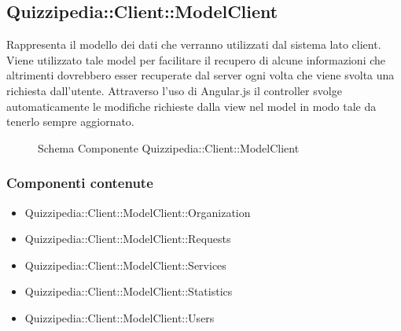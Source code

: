 \subsection{Quizzipedia::Client::ModelClient}
Rappresenta il modello dei dati che verranno utilizzati dal sistema lato client. Viene utilizzato tale model per facilitare il recupero di alcune informazioni che altrimenti dovrebbero esser recuperate dal server ogni volta che viene svolta una richiesta dall'utente.
Attraverso l'uso di Angular.js il controller svolge automaticamente le modifiche richieste dalla view nel model in modo tale da tenerlo sempre aggiornato.
\begin{figure}[H]
\centering
\noindent{}
\caption[Schema Componente Quizzipedia::Client::ModelClient]{Schema Componente Quizzipedia::Client::ModelClient}
\end{figure}
\subsubsection{Componenti contenute}
\begin{itemize}
\item Quizzipedia::Client::ModelClient::Organization
\item Quizzipedia::Client::ModelClient::Requests
\item Quizzipedia::Client::ModelClient::Services
\item Quizzipedia::Client::ModelClient::Statistics
\item Quizzipedia::Client::ModelClient::Users
\end{itemize}
